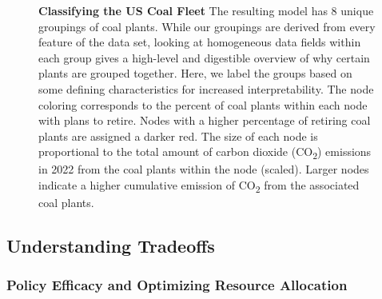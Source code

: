 \begin{figure}[H]
    
    \caption{\textbf{Classifying the US Coal Fleet} The resulting model has 8 unique groupings of coal plants. 
    While our groupings are derived from every feature of the data set, looking at homogeneous data fields within 
    each group gives a high-level and digestible overview of why certain plants are grouped together. Here, we label 
    the groups based on some defining characteristics for increased interpretability.
    The node coloring corresponds to the percent of coal plants within each node with plans to retire. 
    Nodes with a higher percentage of retiring coal plants are assigned a darker red. The size of each node is 
    proportional to the total amount of carbon dioxide (CO\textsubscript{2}) emissions in 2022 from the coal plants within the node (scaled). 
    Larger nodes indicate a higher cumulative emission of CO\textsubscript{2} from the associated coal plants.}
    \label{fig:coal-fleet-partition}
\end{figure}

\subsection{Understanding Tradeoffs}

\subsubsection{Policy Efficacy and Optimizing Resource Allocation}